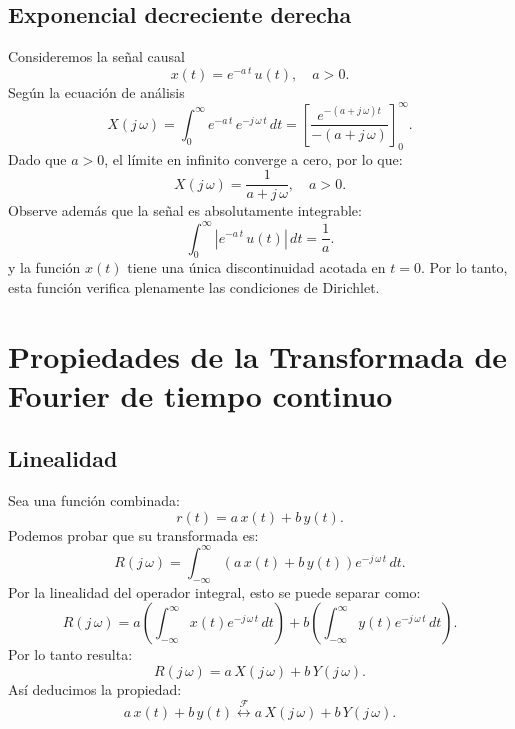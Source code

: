 \subsection{Exponencial decreciente derecha}

Consideremos la señal causal
\begin{equation}
	x(t) = e^{-a \, t} \, u(t), \quad a > 0.
\end{equation}
Según la ecuación de análisis 
\begin{equation}
	X(j \, \omega) = \int_{0}^{\infty} e^{-a \, t} \, e^{-j \, \omega \, t} \, dt = \left[ \frac{e^{-(a + j \, \omega) t}}{-(a + j \, \omega)} \right]_{0}^{\infty}.
\end{equation}
Dado que $a>0$, el límite en infinito converge a cero, por lo que:
\begin{equation}
	X(j \, \omega) = \frac{1}{a + j \, \omega}, \quad a > 0.
\end{equation}
Observe además que la señal es absolutamente integrable:
\begin{equation}
	\int_{0}^{\infty} | e^{-a \, t} \, u(t) | \, dt = \frac{1}{a}.
\end{equation}
y la función $x(t)$ tiene una única discontinuidad acotada en $t = 0$. Por lo tanto, esta función verifica plenamente las condiciones de Dirichlet.

\section{Propiedades de la Transformada de Fourier de tiempo continuo}

\subsection{Linealidad}

Sea una función combinada:
\begin{equation}
	r(t) = a \, x(t) + b \, y(t).
\end{equation}
Podemos probar que su transformada es:
\begin{equation}
	R(j \, \omega) = \int_{-\infty}^{\infty} (a \, x(t) + b \, y(t)) e^{-j \, \omega \, t} \, dt.
\end{equation}
Por la linealidad del operador integral, esto se puede separar como:
\begin{equation}
	R(j \, \omega) = a \left( \int_{-\infty}^{\infty} x(t) e^{-j \, \omega \, t} \, dt \right) + b \left( \int_{-\infty}^{\infty} y(t) e^{-j \, \omega \, t} \, dt \right).
\end{equation}
Por lo tanto resulta:
\begin{equation}
	R(j \, \omega) = a \, X(j \, \omega) + b \, Y(j \, \omega).
\end{equation}
Así deducimos la propiedad:
\begin{equation}
	a \, x(t) + b \, y(t) \stackrel{\mathcal{F}}{\longleftrightarrow} a \, X(j \, \omega) + b \, Y(j \, \omega) .
\end{equation}

